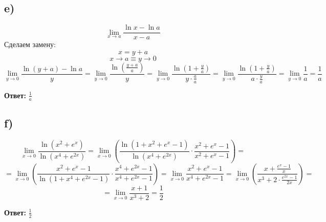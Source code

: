 \documentclass[a4paper,12pt]{article}
\begin{document}
\subsection*{e) }
\[
\lim_{x \rightarrow a} \frac{\ln x - \ln a}{x - a}
\]
Сделаем замену:
\[
x = y + a
\]
\[
x \rightarrow a \equiv y \rightarrow 0
\]
\[
\lim_{y \rightarrow 0} \frac{\ln (y + a) - \ln a}{y} = \lim_{y \rightarrow 0} \frac{\ln (\frac{y + a}{a})}{y} = \lim_{y \rightarrow 0} \frac{\ln (1 + \frac{y}{a})}{y\cdot \frac{a}{a}}  = \lim_{y \rightarrow 0} \frac{\ln (1 + \frac{y}{a})}{a \cdot \frac{y}{a}} = \lim_{y \rightarrow 0} \frac{1}{a} = \frac{1}{a}
\]
\begin{center}
\textbf{Ответ: } $\frac{1}{a}$
\end{center}


\subsection*{f)} 
\[
\lim_{x \rightarrow 0} \frac{\ln(x^2 + e^x)}{\ln (x^4 + e^{2x})} = \lim_{x \rightarrow 0} \left( \frac{\ln (1 + x^2 + e^x -1 )}{\ln (x^4 + e^{2x})} \cdot \frac{x^2 + e^x - 1}{x^2 + e^x - 1} \right) = 
\]
\[
= \lim_{x \rightarrow 0} \left( \frac{x^2 + e^x - 1}{\ln (1 + x^4 + e^{2x} - 1)} \cdot \frac{x^4 + e^{2x} -1}{x^4 + e^{2x} -1 } \right) = \lim_{x \rightarrow 0} \frac{x^2 + e^x -1 }{x^4 + e^{2x} - 1} = \lim_{x \rightarrow 0} \left( \frac{x + \frac{e^x - 1}{x}}{x^3 + 2 \cdot \frac{e^{2x} -1 }{2x}} \right) = 
\]
\[
= \lim_{x \rightarrow 0} \frac{x + 1}{x^3 + 2}  =\frac{1}{2}
\]
\begin{center}
\textbf{Ответ: } $\frac{1}{2}$
\end{center}
\end{document}
